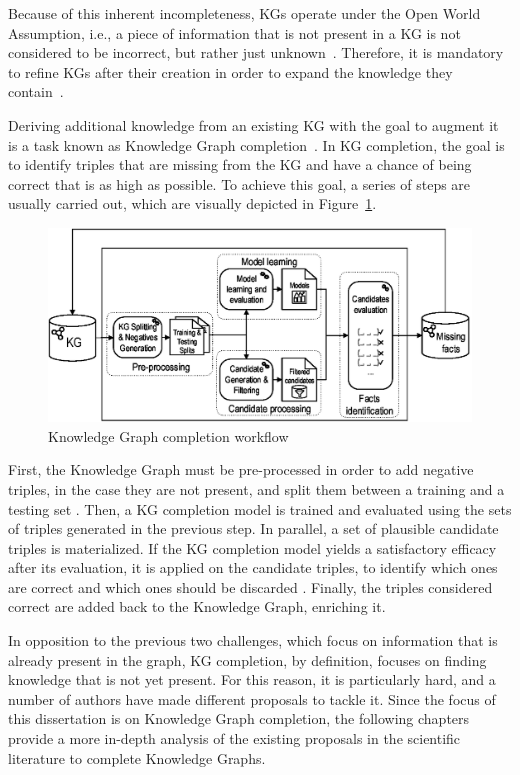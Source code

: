 Because of this inherent incompleteness, KGs operate under the Open World Assumption, i.e., a piece of information that is not present in a KG is not considered to be incorrect, but rather just unknown~\cite{galarraga2015}. Therefore, it is mandatory to refine KGs after their creation in order to expand the knowledge they contain~\cite{paulheim2017}.

Deriving additional knowledge from an existing KG with the goal to augment it is a task known as Knowledge Graph completion~\cite{paulheim2017, shen2022overview}. In KG completion, the goal is to identify triples that are missing from the KG and have a chance of being correct that is as high as possible. To achieve this goal, a series of steps are usually carried out, which are visually depicted in Figure~\ref{fig:kgc-workflow}.

\begin{figure}[!htp]
    \centering
    \includegraphics[width=\textwidth]{fig/kgs/kgc_workflow}
    \caption{Knowledge Graph completion workflow}
    \label{fig:kgc-workflow}
\end{figure}

First, the Knowledge Graph must be pre-processed in order to add negative triples, in the case they are not present, and split them between a training and a testing set \cite{ayala2019}. Then, a KG completion model is trained and evaluated using the sets of triples generated in the previous step. In parallel, a set of plausible candidate triples is materialized. If the KG completion model yields a satisfactory efficacy after its evaluation, it is applied on the candidate triples, to identify which ones are correct and which ones should be discarded \cite{borrego2021, borrego2019,shen2022overview}. Finally, the triples considered correct are added back to the Knowledge Graph, enriching it.

In opposition to the previous two challenges, which focus on information that is already present in the graph, KG completion, by definition, focuses on finding knowledge that is not yet present. For this reason, it is particularly hard, and a number of authors have made different proposals to tackle it. Since the focus of this dissertation is on Knowledge Graph completion, the following chapters provide a more in-depth analysis of the existing proposals in the scientific literature to complete Knowledge Graphs.

